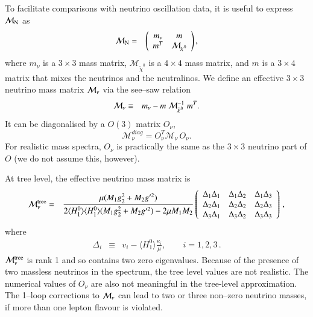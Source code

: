 \documentclass[pdflatex,final,3p,times]{elsarticle}
\begin{document}
To facilitate comparisons with neutrino oscillation data, it is useful
to express ${\cal M}_{\rm N}$ as
\begin{eqnarray}\label{neutralino34}
  {\cal M}_{\rm N} &=& \left( \begin{array}{cc} m_{\nu} & m \\ m^T &
    \mathcal{M}_{\chi^0}
  \end{array} \right),
\end{eqnarray}
where $m_{\nu}$ is a $3\times 3$ mass matrix, $\mathcal{M}_
{\tilde{\chi}^0}$ is a $4\times 4$ mass matrix, and $m$ is a $3\times
4$ matrix that mixes the neutrinos and the neutralinos. We define an
effective $3\times3$ neutrino mass matrix ${\cal M}_{\nu}$ via the
see--saw relation
\begin{eqnarray}\label{nueffective} 
  {\cal M}_{\nu} &\equiv& m_{\nu} - m \;
  \mathcal{M}_{\tilde{\chi}^0}^{-1} \; m^T.
\end{eqnarray}
It can be diagonalised by a $O(3)$ matrix
$O_{\nu}$,
\begin{equation}
{\mathcal M}_{\nu}^{diag} = O_{\nu}^T {\mathcal M}_{\nu}\, O_{\nu}. \label{Numix}
\end{equation}
For realistic mass spectra, $O_{\nu}$ is practically the same as
the $3\times3$ neutrino part of $O$ (we do not assume this, however). 

At tree level, the effective neutrino mass matrix is~\cite{Allanach:2003eb}
\begin{eqnarray}
{\cal M}_{\nu}^{\rm tree} &=& \frac{\mu (M_1g^2_2 + M_2g'^2)}{2 \langle H_1^0
  \rangle \langle H_1^0 \rangle (M_1g^2_2 + M_2g'^2)- 2 \mu M_1M_2}
\left( \begin{array}{ccc}
\Delta_1\Delta_1 & \Delta_1\Delta_2 &\Delta_1\Delta_3\\
\Delta_2\Delta_1 & \Delta_2\Delta_2 &\Delta_2\Delta_3\\
\Delta_3\Delta_1 & \Delta_3\Delta_2 &\Delta_3\Delta_3 \end{array} \right)\, ,
\label{mnutree_matrix}
\end{eqnarray}
where
\begin{eqnarray}
\Delta_i &\equiv&  v_i - \langle H_1^0 \rangle \frac{\kappa_i}{\mu}, \qquad i=1,2,3 \,.
\label{Lambda}
\end{eqnarray}
${\cal M}_{\nu}^{\rm tree}$ is rank 1 and so contains two zero eigenvalues.
Because of the presence of two massless neutrinos in the
spectrum, the tree level values are not realistic.  The numerical
values of $O_{\nu}$ are also not meaningful in the tree-level approximation.
The 1--loop corrections 
to ${\cal M}_{\nu}$ can lead to two or three non--zero neutrino
masses, if more than one lepton flavour is violated.  
\end{document}
